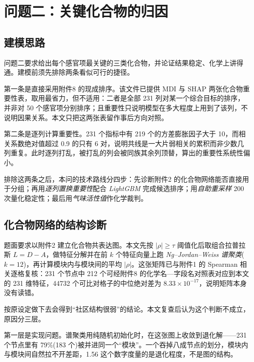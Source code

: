 \section{问题二：关键化合物的归因}

\subsection{建模思路}

问题二要求给出每个感官项最关键的三类化合物，并论证结果稳定、化学上讲得通。建模前须先排除两条看似可行的捷径。

第一条是直接采用附件8 的现成排序。该文件已提供 MDI 与 SHAP 两张化合物重要性表，取用最省力，但不适用：二者是全部 231 列对某一个综合目标的排序，并非对 50 个感官项分别排序；且重要性只说明模型在多大程度上用到了该列，不说明因果关系\cite{lundberg2017}。本文只把这两张表留作事后方向对照。

第二条是逐列计算重要性。231 个指标中有 219 个的方差膨胀因子大于 10，而相关系数绝对值超过 0.9 的只有 6 对，说明共线是一大片弱相关的累积而非少数几列重复。此时逐列打乱，被打乱的列会被同族其余列顶替，算出的重要性系统性偏小\cite{strobl2008}。

排除这两条之后，本问的技术路线分四步：先诊断附件2 的化合物网络能否直接用于分组；再用\emph{逐列置换重要性}配合 \emph{LightGBM} 完成候选排序；用\emph{自助重采样} 200 次量化稳定性；最后用\emph{气味活性值}作化学裁判。

\subsection{化合物网络的结构诊断}

题面要求以附件2 建立化合物共表达图。本文先按 $|\rho|\geq\tau$ 阈值化后取组合拉普拉斯 $L=D-A$，做特征分解并在前 $k$ 个特征向量上跑 \emph{Ng--Jordan--Weiss 谱聚类}($k=12$)，再计算模块内与模块间的平均 $|\rho|$。这张矩阵已与附件1 的 Spearman 相关逐格复核：231 个节点中 212 个可经附件8 的化学名—字段名对照表对应到本文的 231 维特征，44732 个可比对格子的中位绝对差为 $8.33\times10^{-17}$，说明矩阵本身没有读错。

按原设定做下去会得到“社区结构很弱”的结论。本文复查后认为这个判断不成立，原因分三层。

第一层是实现问题。谱聚类用纯随机初始化时，在这张图上收敛到退化解——231 个节点里有 79\%(183 个)被并进同一个“模块”。一个吞掉八成节点的划分，模块内与模块间自然拉不开差距，1.56 这个数字度量的是退化程度，不是图的结构。

